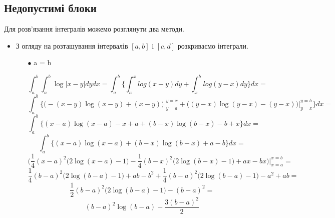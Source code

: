 \documentclass[12pt]{report}
\begin{document}
	\subsection{Недопустимі блоки}
	Для розв'язання інтегралів можемо розглянути два методи.
		\begin{itemize}
			\item З огляду на розташування інтервалів $[a,b]$ i $[c,d]$ розкриваємо інтеграли. 
		\begin{itemize}
			\item[$\bullet$] a = b
			
			$$\int_{a}^{b}\int_{a}^{b}\log\big| x-y \big|dydx=\int_{a}^{b}\Bigg\{\int_{a}^{x}log(x-y)dy+\int_{x}^{b}log(y-x)dy\Bigg\}dx =$$ $$\int_{a}^{b}\Bigg\{\big(-(x-y)\log(x-y)+(x-y)\big)\Big|_{y=a}^{y=x}+\big((y-x)\log(y-x)-(y-x)\big)\Big|_{y=x}^{y=b} \Bigg\}dx = $$
			$$\int_{a}^{b}\Bigg\{(x-a)\log(x-a)-x+a+(b-x)\log(b-x)-b+x\Bigg\}dx=$$
			$$\int_{a}^{b}\Bigg\{(x-a)\log(x-a)+(b-x)\log(b-x)+a-b\Bigg\}dx=$$
			$$\Bigg(\frac{1}{4}(x-a)^2\big(2\log(x-a)-1\big)-\frac{1}{4}(b-x)^2\big(2\log(b-x)-1\big)+ax-bx\Bigg)\Big|_{x=a}^{x=b}=$$
			$$\frac{1}{4}(b-a)^2\big(2\log(b-a)-1\big)+ab-b^2+\frac{1}{4}(b-a)^2\big(2\log(b-a)-1\big)-a^2+ab=$$
			$$\frac{1}{2}(b-a)^2\big(2\log(b-a)-1\big)-(b-a)^2=$$
			$$(b-a)^2\log(b-a)-\frac{3(b-a)^2}{2}$$
		

\end{itemize}
\end{itemize}
\end{document}
